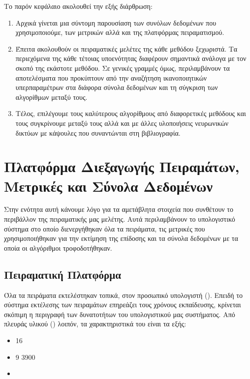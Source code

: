 Το παρόν κεφάλαιο ακολουθεί την εξής διάρθρωση:
\begin{enumerate}
    \item Αρχικά γίνεται μια σύντομη παρουσίαση των συνόλων δεδομένων που χρησιμοποιούμε, των μετρικών αλλά και της πλατφόρμας πειραματισμού.
    \item Έπειτα ακολουθούν οι πειραματικές μελέτες της κάθε μεθόδου ξεχωριστά. Τα περιεχόμενα της κάθε τέτοιας υποενότητας διαφέρουν σημαντικά ανάλογα με τον σκοπό της εκάστοτε μεθόδου. Σε γενικές γραμμές όμως, περιλαμβάνουν τα αποτελέσματα που προκύπτουν από την αναζήτηση ικανοποιητικών υπερπαραμέτρων στα διάφορα σύνολα δεδομένων και τη σύγκριση των αλγορίθμων μεταξύ τους.
    \item Τέλος, επιλέγουμε τους καλύτερους αλγορίθμους από διαφορετικές μεθόδους και τους συγκρίνουμε μεταξύ τους αλλά και με άλλες υλοποιήσεις νευρωνικών δικτύων με κάψουλες που συναντώνται στη βιβλιογραφία.
\end{enumerate}

\section{Πλατφόρμα Διεξαγωγής Πειραμάτων, Μετρικές και Σύνολα Δεδομένων} 
Στην ενότητα αυτή κάνουμε λόγο για τα αμετάβλητα στοιχεία που συνθέτουν το περιβάλλον της πειραματικής μας μελέτης. Αυτά περιλαμβάνουν το υπολογιστικό σύστημα στο οποίο διενεργήθηκαν όλα τα πειράματα, τις μετρικές που χρησιμοποιήθηκαν για την εκτίμηση της επίδοσης και τα σύνολα δεδομένων με τα οποία οι αλγόριθμοι τροφοδοτήθηκαν.
\subsection{Πειραματική Πλατφόρμα}
Όλα τα πειράματα εκτελέστηκαν τοπικά, στον προσωπικό υπολογιστή (). Επειδή το σύστημα εκτέλεσης των πειραμάτων επηρεάζει τους χρόνους εκπαίδευσης, κρίνεται σκόπιμη η περιγραφή των δυνατοτήτων του υπολογιστικού μας συστήματος. Από πλευράς υλικού () λοιπόν, τα χαρακτηριστικά του είναι τα εξής:
\begin{itemize}
    \item 16
    \item {} 9 3900
    \item {}
\end{itemize}

